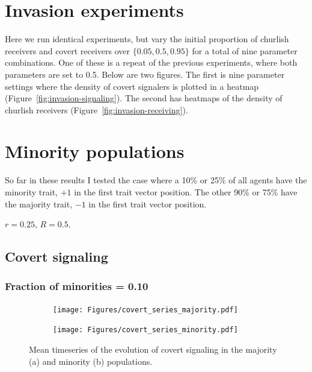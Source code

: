 \documentclass[11pt,letterpaper]{article}
\begin{document}
\section{Invasion experiments}

Here we run identical experiments, but vary the initial proportion of 
churlish receivers and covert receivers over $\{0.05, 0.5, 0.95\}$ for a total
of nine parameter combinations. One of these is a repeat of the previous
experiments, where both parameters are set to 0.5. Below are two figures.
The first is nine parameter settings where the density of covert signalers
is plotted in a heatmap (Figure~\ref{fig:invasion-signaling}). The second has 
heatmaps of the density of churlish receivers (Figure~\ref{fig:invasion-receiving}).





\section{Minority populations}

So far in these results I tested the case where a 10\% or 25\% of all agents have
the minority trait, $+1$ in the first trait vector position. 
The other 90\% or 75\% have the majority trait, $-1$ in the first trait vector position.

$r=0.25$, $R=0.5$.

\subsection{Covert signaling}

\subsubsection{Fraction of minorities = 0.10}
\begin{figure}[H]
  \centering
  \begin{subfigure}{0.49\textwidth}
    \centering
    \texttt{[image: Figures/covert\_series\_majority.pdf]}
    \caption{}
    \label{fig:}
  \end{subfigure}
  \begin{subfigure}{0.49\textwidth}
    \centering
    \texttt{[image: Figures/covert\_series\_minority.pdf]}
    \caption{}
    \label{fig:}
  \end{subfigure}
  \caption{Mean timeseries of the evolution of covert signaling in the
    majority (a) and minority (b) populations.}
  \label{fig:}
\end{figure}
\end{document}
